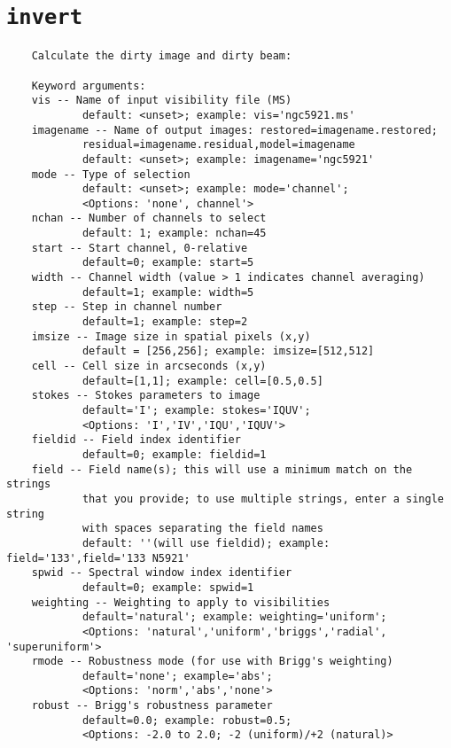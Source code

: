 \section{{\tt invert}}
\label{section:tasks.invert}

\small
\begin{verbatim}
    Calculate the dirty image and dirty beam:
    
    Keyword arguments:
    vis -- Name of input visibility file (MS)
            default: <unset>; example: vis='ngc5921.ms'
    imagename -- Name of output images: restored=imagename.restored;
            residual=imagename.residual,model=imagename
            default: <unset>; example: imagename='ngc5921'
    mode -- Type of selection 
            default: <unset>; example: mode='channel'; 
            <Options: 'none', channel'>
    nchan -- Number of channels to select
            default: 1; example: nchan=45
    start -- Start channel, 0-relative
            default=0; example: start=5
    width -- Channel width (value > 1 indicates channel averaging)
            default=1; example: width=5
    step -- Step in channel number
            default=1; example: step=2      
    imsize -- Image size in spatial pixels (x,y)
            default = [256,256]; example: imsize=[512,512]
    cell -- Cell size in arcseconds (x,y)
            default=[1,1]; example: cell=[0.5,0.5]
    stokes -- Stokes parameters to image
            default='I'; example: stokes='IQUV'; 
            <Options: 'I','IV','IQU','IQUV'>
    fieldid -- Field index identifier
            default=0; example: fieldid=1
    field -- Field name(s); this will use a minimum match on the strings
            that you provide; to use multiple strings, enter a single string
            with spaces separating the field names
            default: ''(will use fieldid); example: field='133',field='133 N5921'
    spwid -- Spectral window index identifier
            default=0; example: spwid=1
    weighting -- Weighting to apply to visibilities
            default='natural'; example: weighting='uniform'; 
            <Options: 'natural','uniform','briggs','radial', 'superuniform'>
    rmode -- Robustness mode (for use with Brigg's weighting)
            default='none'; example='abs'; 
            <Options: 'norm','abs','none'>
    robust -- Brigg's robustness parameter 
            default=0.0; example: robust=0.5; 
            <Options: -2.0 to 2.0; -2 (uniform)/+2 (natural)>
\end{verbatim}
\normalsize


